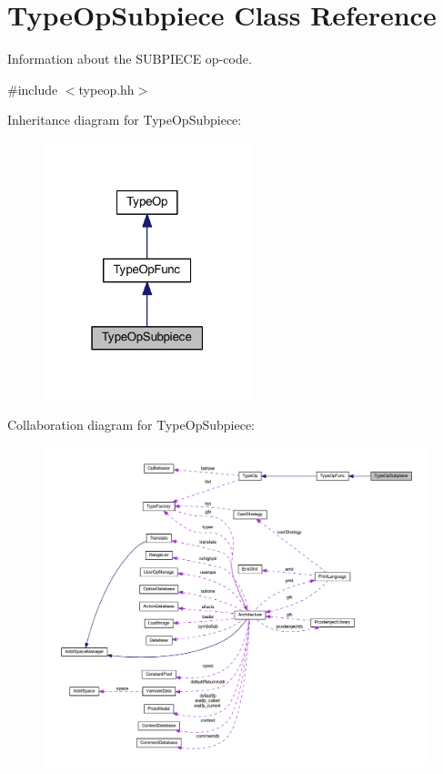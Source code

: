 \hypertarget{class_type_op_subpiece}{}\section{Type\+Op\+Subpiece Class Reference}
\label{class_type_op_subpiece}


Information about the S\+U\+B\+P\+I\+E\+CE op-\/code.  




{\ttfamily \#include $<$typeop.\+hh$>$}



Inheritance diagram for Type\+Op\+Subpiece\+:
\nopagebreak
\begin{figure}[H]
\begin{center}
\leavevmode
\includegraphics[width=171pt]{class_type_op_subpiece__inherit__graph}
\end{center}
\end{figure}


Collaboration diagram for Type\+Op\+Subpiece\+:
\nopagebreak
\begin{figure}[H]
\begin{center}
\leavevmode
\includegraphics[width=350pt]{class_type_op_subpiece__coll__graph}
\end{center}
\end{figure}
